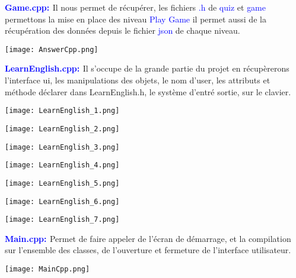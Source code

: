 \documentclass[12pt, a4paper]{report}
\begin{document}

\textbf{\textcolor{blue}{Game.cpp: }} Il nous permet de récupérer, les fichiers \textcolor{blue}{.h} de \textcolor{blue}{quiz} et \textcolor{blue}{game} permettons la mise en place des niveau \textcolor{blue}{Play Game} il permet aussi de la récupération des données depuis le fichier \textcolor{blue}{json} de chaque niveau.
\bigskip
\begin{center}
\texttt{[image: AnswerCpp.png]}
\end{center}


\textbf{\textcolor{blue}{LearnEnglish.cpp: }} Il s’occupe de la grande partie du projet en récupèrerons l’interface ui, les manipulations des objets, le nom d’user, les attributs et méthode déclarer dans LearnEnglish.h, le système d’entré sortie, sur le clavier.
\bigskip
\begin{center}
\texttt{[image: LearnEnglish\_1.png]}
\end{center}
\bigskip
\begin{center}
\texttt{[image: LearnEnglish\_2.png]}
\end{center}
\bigskip
\begin{center}
\texttt{[image: LearnEnglish\_3.png]}
\end{center}
\bigskip
\begin{center}
\texttt{[image: LearnEnglish\_4.png]}
\end{center}
\bigskip
\begin{center}
\texttt{[image: LearnEnglish\_5.png]}
\end{center}
\bigskip
\begin{center}
\texttt{[image: LearnEnglish\_6.png]}
\end{center}
\bigskip
\begin{center}
\texttt{[image: LearnEnglish\_7.png]}
\end{center}
\textbf{\textcolor{blue}{Main.cpp: }} Permet de faire appeler de l’écran de démarrage, et la compilation sur l’ensemble des classes, de l’ouverture et fermeture de l’interface utilisateur.
\bigskip
\begin{center}
\texttt{[image: MainCpp.png]}
\end{center}
\end{document}
